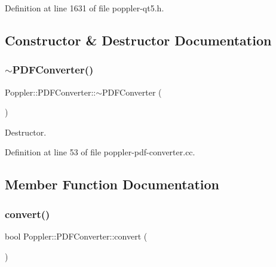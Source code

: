 Definition at line 1631 of file poppler-\/qt5.\+h.



\subsection{Constructor \& Destructor Documentation}
\mbox{\label{class_poppler_1_1_p_d_f_converter_a270aae35fe466a674be22e89c9777a7b}} 
\subsubsection{\texorpdfstring{$\sim$\+P\+D\+F\+Converter()}{~PDFConverter()}}
{\footnotesize\ttfamily Poppler\+::\+P\+D\+F\+Converter\+::$\sim$\+P\+D\+F\+Converter (\begin{DoxyParamCaption}{ }\end{DoxyParamCaption})\hspace{0.3cm}{\ttfamily [virtual]}}

Destructor. 

Definition at line 53 of file poppler-\/pdf-\/converter.\+cc.



\subsection{Member Function Documentation}
\mbox{\label{class_poppler_1_1_p_d_f_converter_a35f0de4e846e850c489b7f1b265908b5}} 
\subsubsection{\texorpdfstring{convert()}{convert()}}
{\footnotesize\ttfamily bool Poppler\+::\+P\+D\+F\+Converter\+::convert (\begin{DoxyParamCaption}{ }\end{DoxyParamCaption})\hspace{0.3cm}{\ttfamily [virtual]}}

